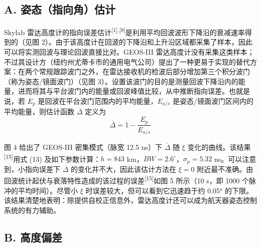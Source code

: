 

\subsection*{A. 姿态（指向角）估计}

Skylab 雷达高度计的指向误差估计\textsuperscript{[1],[8]}是利用平均回波波形下降沿的衰减速率得到的（见图 2）。由于该高度计在回波的下降沿和上升沿区域都采集了样本，因此可以将实测回波与理论回波直接比对。GEOS-III 雷达高度计没有采集这类样本；不过其设计方（纽约州尤蒂卡市的通用电气公司）提出了一种更易于实现的替代方案：在两个常规跟踪波门之外，在雷达接收机的检波后部分增加第三个积分波门（称为姿态/镜面波门）（见图 3）。设置该波门的目的是测量回波下降沿内的能量，进而将其与平台波门内的能量或回波峰值比较，从中推断指向误差。也就是说，若 $E_{p}$ 是回波在平台波门范围内的平均能量，$E_{a/s}$ 是姿态/镜面波门区间内的平均能量，则估计函数 $\overline{\Delta}$ 定义为
\[
\overline{\Delta} = 1 - \frac{E_{p}}{E_{a/s}}
\]



图 4 给出了 GEOS-III 密集模式（脉宽 12.5 ns）下 $\overline{\Delta}$ 随 $\xi$ 变化的曲线。该结果\textsuperscript{[15]}用式 (13) 及如下参数计算：$h = 843$ km，$BW = 2.6^{\circ}$，$\sigma_{p} = 5.32$ ns。可以注意到，小指向误差下 $\overline{\Delta}$ 的变化并不大，因此该估计方法在 $\xi = 0$ 附近最不准确。由回波统计起伏与衰落特性造成的该过程的误差\textsuperscript{[15]}如图 5 所示（10 s，即 1000 个脉冲的平均时间）。尽管小 $\xi$ 时误差较大，但可以看到它迅速趋于约 0.05° 的下限。该结果清楚地表明：除提供自校正信息外，雷达高度计还可以成为航天器姿态控制系统的有力辅助。

\subsection*{B. 高度偏差}

